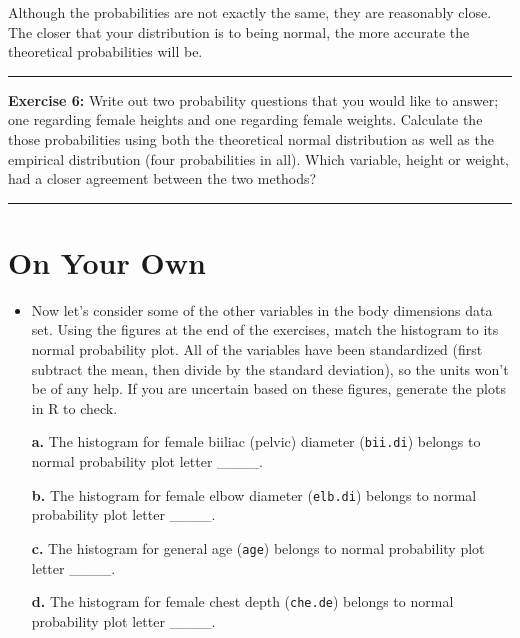\documentclass[]{book}
\theoremstyle{definition}
\theoremstyle{definition}
\theoremstyle{definition}
\theoremstyle{remark}
\begin{document}
Although the probabilities are not exactly the same, they are reasonably
close. The closer that your distribution is to being normal, the more
accurate the theoretical probabilities will be.

\begin{center}\rule{0.5\linewidth}{\linethickness}\end{center}

\textbf{Exercise 6:} Write out two probability questions that you would
like to answer; one regarding female heights and one regarding female
weights. Calculate the those probabilities using both the theoretical
normal distribution as well as the empirical distribution (four
probabilities in all). Which variable, height or weight, had a closer
agreement between the two methods?

\begin{center}\rule{0.5\linewidth}{\linethickness}\end{center}

\hypertarget{on-your-own-2}{%
\section{On Your Own}\label{on-your-own-2}}

\begin{itemize}
\item
  Now let's consider some of the other variables in the body dimensions
  data set. Using the figures at the end of the exercises, match the
  histogram to its normal probability plot. All of the variables have
  been standardized (first subtract the mean, then divide by the
  standard deviation), so the units won't be of any help. If you are
  uncertain based on these figures, generate the plots in R to check.

  \textbf{a.} The histogram for female biiliac (pelvic) diameter
  (\texttt{bii.di}) belongs to normal probability plot letter \_\_\_\_.

  \textbf{b.} The histogram for female elbow diameter (\texttt{elb.di})
  belongs to normal probability plot letter \_\_\_\_.

  \textbf{c.} The histogram for general age (\texttt{age}) belongs to
  normal probability plot letter \_\_\_\_.

  \textbf{d.} The histogram for female chest depth (\texttt{che.de})
  belongs to normal probability plot letter \_\_\_\_.
\end{itemize}
\end{document}

